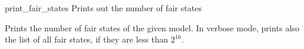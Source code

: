 \begin{nusmvCommand}{print\_fair\_states} {Prints out the number of fair states}


Prints the number of fair states of the given model. In verbose mode,
prints also the list of all fair states, if they are less than $2^{16}$.

\end{nusmvCommand}
